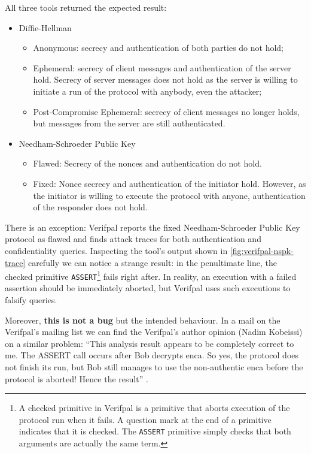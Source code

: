 All three tools returned the expected result:
\begin{itemize}
    \item{Diffie-Hellman
                \begin{itemize}
                    \item Anonymous: secrecy and authentication of both parties do not hold;
                    \item Ephemeral: secrecy of client messages and authentication of the server hold. Secrecy of server messages does not hold as the server is willing to initiate a run of the protocol with anybody, even the attacker;
                    \item Post-Compromise Ephemeral: secrecy of client messages no longer holds, but messages from the server are still authenticated.
                \end{itemize}
          }
    \item{Needham-Schroeder Public Key
                \begin{itemize}
                    \item Flawed: Secrecy of the nonces and authentication do not hold.
                    \item Fixed: Nonce secrecy and authentication of the initiator hold. However, as the initiator is willing to execute the protocol with anyone, authentication of the responder does not hold.
                \end{itemize}
          }
\end{itemize}

\lstset{language=verifpal}
There is an exception: Verifpal reports the fixed Needham-Schroeder Public Key  protocol as flawed and finds attack traces for both authentication and confidentiality queries.
Inspecting the tool's output shown in \cref{fig:verifpal-nspk-trace} carefully we can notice a strange result: in the penultimate line, the checked primitive \lstinline{ASSERT}\footnote{A checked primitive in Verifpal is a primitive that aborts execution of the protocol run when it fails. A question mark at the end of a primitive indicates that it is checked. The \lstinline{ASSERT} primitive simply checks that both arguments are actually the same term.} fails right after. In reality, an execution with a failed assertion should be immediately aborted, but Verifpal uses such executions to falsify queries.

Moreover, \textbf{this is not a bug} but the intended behaviour. In a mail on the Verifpal's mailing list we can find the Verifpal's author opinion (Nadim Kobeissi) on a similar problem: ``This analysis result appears to be completely correct to me. The ASSERT call occurs after Bob decrypts enca. So yes, the protocol does not finish its run, but Bob still manages to use the non-authentic enca before the protocol is aborted! Hence the result'' \cite{VerifpalMail}.

